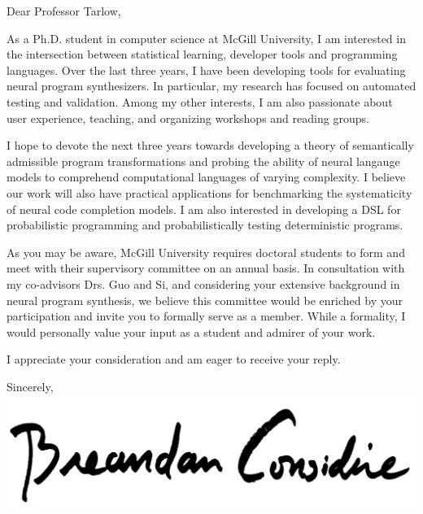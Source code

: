 \documentclass{letter}
\begin{document}
    \begin{letter}{}
        \opening{Dear Professor Tarlow,\\}
        As a Ph.D. student in computer science at McGill University, I am interested in the intersection between statistical learning, developer tools and programming languages. Over the last three years, I have been developing tools for evaluating neural program synthesizers. In particular, my research has focused on automated testing and validation. Among my other interests, I am also passionate about user experience, teaching, and organizing workshops and reading groups.

        I hope to devote the next three years towards developing a theory of semantically admissible program transformations and probing the ability of neural langauge models to comprehend computational languages of varying complexity. I believe our work will also have practical applications for benchmarking the systematicity of neural code completion models. I am also interested in developing a DSL for probabilistic programming and probabilistically testing deterministic programs.

        As you may be aware, McGill University requires doctoral students to form and meet with their supervisory committee on an annual basis. In consultation with my co-advisors Drs. Guo and Si, and considering your extensive background in neural program synthesis, we believe this committee would be enriched by your participation and invite you to formally serve as a member. While a formality, I would personally value your input as a student and admirer of your work.

        I appreciate your consideration and am eager to receive your reply.\\

        \closing{Sincerely,\\
        \includegraphics[scale=0.06]{signature}\\
        }
    \end{letter}
\end{document}
